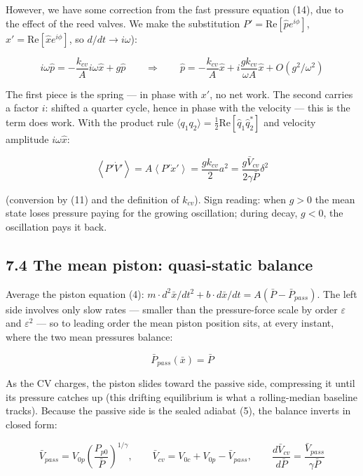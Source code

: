 \documentclass[11pt]{article}
\begin{document}
However, we have some correction from the fast pressure equation (14), due to the effect of the reed valves. We make the substitution $P' = \mathrm{Re}[\hat pe^{i\phi}]$, $x' = \mathrm{Re}[\hat xe^{i\phi}]$, so $d/dt \to i\omega$):

\[
i\omega\hat p = -\frac{k_{cv}}{A}i\omega\hat x + g\hat p \qquad\Longrightarrow\qquad \hat p = -\frac{k_{cv}}{A}\hat x + i\frac{gk_{cv}}{\omega A}\hat x + O(g^2/\omega^2)
\]

The first piece is the spring --- in phase with $x'$, no net work. The second carries a factor $i$: shifted a quarter cycle, hence in phase with the velocity --- this is the term does work. With the product rule $\langle q_1q_2\rangle = \frac{1}{2}\mathrm{Re}[\hat q_1\hat q_2^*]$ and velocity amplitude $i\omega\hat x$:

\begin{equation}
\left\langle P'\dot V'\right\rangle = A\left\langle P'\dot x'\right\rangle = \frac{gk_{cv}}{2}a^2 = \frac{g\bar V_{cv}}{2\gamma\bar P}\delta^2 \tag{24}
\end{equation}

(conversion by (11) and the definition of $k_{cv}$). Sign reading: when $g > 0$ the mean state loses pressure paying for the growing oscillation; during decay, $g < 0$, the oscillation pays it back.

\subsection*{7.4 The mean piston: quasi-static balance}

Average the piston equation (4): $m \cdot d^2\bar x/dt^2 + b \cdot d\bar x/dt = A(\bar P - \bar P_{pass})$. The left side involves only slow rates --- smaller than the pressure-force scale by order $\varepsilon$ and $\varepsilon^2$ --- so to leading order the mean piston position sits, at every instant, where the two mean pressures balance:

\[
\bar P_{pass}(\bar x) = \bar P
\]

As the CV charges, the piston slides toward the passive side, compressing it until its pressure catches up (this drifting equilibrium is what a rolling-median baseline tracks). Because the passive side is the sealed adiabat (5), the balance inverts in closed form:

\begin{equation}
\bar V_{pass} = V_{0p}\left(\frac{P_{p0}}{\bar P}\right)^{1/\gamma}, \qquad \bar V_{cv} = V_{0c} + V_{0p} - \bar V_{pass}, \qquad \frac{d\bar V_{cv}}{d\bar P} = \frac{\bar V_{pass}}{\gamma\bar P} \tag{25}
\end{equation}
\end{document}
